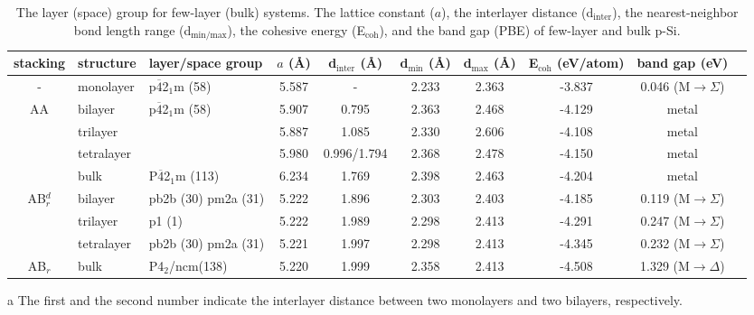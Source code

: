 \begin{landscape}
\begin{table}[htbp]
\centering
\begin{threeparttable}[b]
\caption{The layer (space) group for few-layer (bulk) systems. The lattice constant ($a$), the interlayer distance (d$_{\text{inter}}$), the nearest-neighbor bond length range (d$_{\text{min/max}}$), the cohesive energy (E$_{\text{coh}}$), and the band gap (PBE) of few-layer and bulk p-Si.}
\label{few-layer-table}
\begin{tabular}{cllccccccc}
\hline
stacking & structure & layer/space group & $a$ (\AA) & d$_{\text{inter}}$ (\AA) & d$_{\text{min}}$ (\AA) & d$_{\text{max}}$ (\AA) & E$_{\text{coh}}$ (eV/atom) & band gap (eV)   &  \\[3pt]  \hline
-& monolayer & p$\overline{4}$2$_1$m (58) & 5.587  & - & 2.233 & 2.363 & -3.837 &  0.046 (M$\rightarrow \Sigma$) & \\[3pt] \hline
\multirow{4}{*}{AA}
& bilayer    & \multirow{3}{*}{p$\overline{4}$2$_1$m (58)} & 5.907  & 0.795 & 2.363 & 2.468 & -4.129 & metal  &  \\[3pt]
& trilayer   &   &5.887   & 1.085    & 2.330 & 2.606 & -4.108           & metal          &  \\[3pt]
& tetralayer &   & 5.980  & 0.996/1.794\tnote{a}   & 2.368 &	2.478   & -4.150           & metal          &  \\[3pt]
& bulk       & P$\overline{4}$2$_1$m (113)  & 6.234  & 1.769    & 2.398 & 2.463          & -4.204            & metal           &  \\[3pt] \hline
\multirow{3}{*}{AB$_r^d$}                          
& bilayer   & pb2b (30) pm2a (31) & 5.222            & 1.896      &2.303 &	2.403         & -4.185           & 0.119 (M$\rightarrow \Sigma$) &  \\[3pt]
& trilayer  & p1 (1) & 5.222            & 1.989     & 2.298 &	2.413           & -4.291           & 0.247 (M$\rightarrow \Sigma$) &  \\[3pt]
& tetralayer & pb2b (30) pm2a (31) & 5.221            & 1.997       & 2.298	 & 2.413         & -4.345           & 0.232 (M$\rightarrow \Sigma$) &  \\[3pt]
AB$_r$ & bulk      & P4$_2$/ncm(138) & 5.220         & 1.999       & 2.358 &	2.413         & -4.508           & 1.329 (M$\rightarrow \Delta$) & \\ \hline
\end{tabular}
\begin{tablenotes}
\item [a]The first and the second number indicate the interlayer distance between two monolayers and two bilayers, respectively.
\end{tablenotes}
\end{threeparttable}
\end{table}

\end{landscape}


